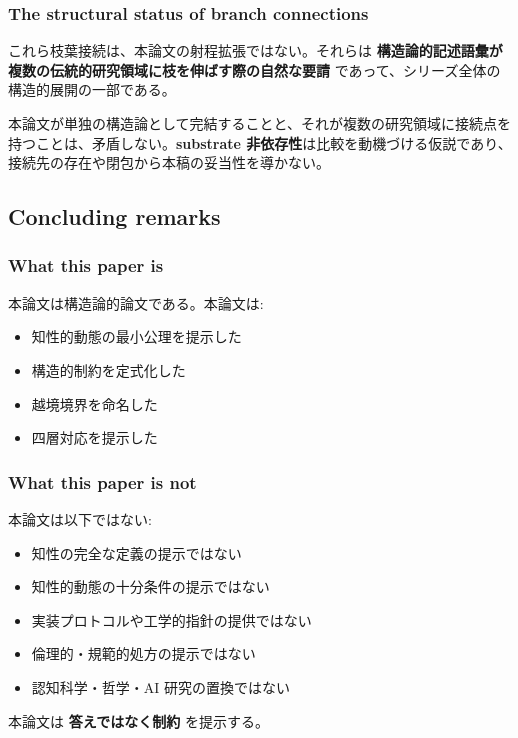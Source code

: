 \subsubsection{The structural status of branch connections}


これら枝葉接続は、本論文の射程拡張ではない。それらは \textbf{構造論的記述語彙が複数の伝統的研究領域に枝を伸ばす際の自然な要請} であって、シリーズ全体の構造的展開の一部である。

本論文が単独の構造論として完結することと、それが複数の研究領域に接続点を持つことは、矛盾しない。\textbf{substrate 非依存性}は比較を動機づける仮説であり、接続先の存在や閉包から本稿の妥当性を導かない。

\subsection{Concluding remarks}


\subsubsection{What this paper is}


本論文は構造論的論文である。本論文は:

\begin{itemize}
\item 知性的動態の最小公理を提示した
\item 構造的制約を定式化した
\item 越境境界を命名した
\item 四層対応を提示した
\end{itemize}

\subsubsection{What this paper is not}


本論文は以下ではない:

\begin{itemize}
\item 知性の完全な定義の提示ではない
\item 知性的動態の十分条件の提示ではない
\item 実装プロトコルや工学的指針の提供ではない
\item 倫理的・規範的処方の提示ではない
\item 認知科学・哲学・AI 研究の置換ではない
\end{itemize}

本論文は \textbf{答えではなく制約} を提示する。

